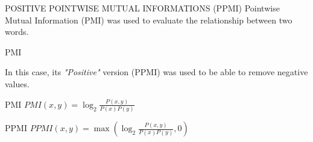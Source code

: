 \begin{frame}{POSITIVE POINTWISE MUTUAL INFORMATIONS (PPMI)}
    Pointwise Mutual Information (PMI) was used to evaluate the relationship between two words.
    \begin{block}{PMI}
        \small \emph{\footnotemark[2]}
    \end{block}
    In this case, its \emph{"Positive"} version (PPMI) was used to be able to remove negative values.
    \begin{minipage}{\linewidth}
        \centering
        \begin{minipage}{0.40\linewidth}
            \begin{block}{\centering PMI}
                \centering \small $ PMI(x,y) = \log_2\frac{P(x,y)}{P(x)P(y)} $
            \end{block} 
        \end{minipage}
        \hspace{0.05\linewidth}
        \begin{minipage}{0.50\linewidth}
            \begin{block}{\centering PPMI}
                \centering \small $ PPMI(x,y) = \max(\log_2\frac{P(x,y)}{P(x)P(y)}, 0) $
            \end{block}
        \end{minipage}
    \end{minipage}
\end{frame}

